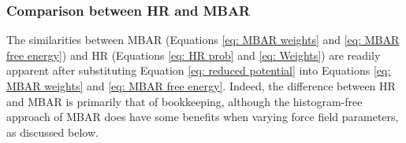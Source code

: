 \documentclass[journal=jced,manuscript=article]{achemso}
\newcommand{\bfv}[1]{{\mbox{\boldmath{$#1$}}}}
\newcommand{\x}{\bfv{x}}
\begin{document}
\subsubsection{Comparison between HR and MBAR} \label{sec: HR and MBAR}

The similarities between MBAR (Equations \ref{eq: MBAR weights} and \ref{eq: MBAR free energy}) and HR (Equations \ref{eq: HR prob} and \ref{eq: Weights}) are readily apparent after substituting Equation \ref{eq: reduced potential} into Equations \ref{eq: MBAR weights} and \ref{eq: MBAR free energy}. Indeed, the difference between HR and MBAR is primarily that of bookkeeping, although the histogram-free approach of MBAR does have some benefits when varying force field parameters, as discussed below. 



\end{document}
